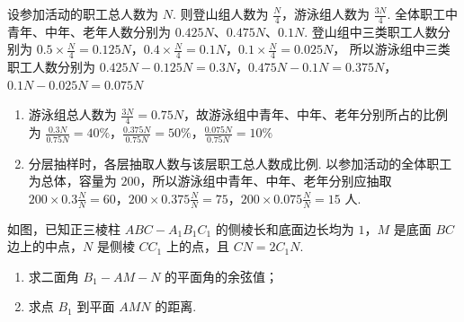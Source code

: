 \begin{solution}
设参加活动的职工总人数为 \(N\). 则登山组人数为 \(\frac N4\)，游泳组人数为 \(\frac{3N}{4}\). 全体职工中青年、中年、老年人数分别为 \(0.425N\)、\(0.475N\)、\(0.1N\). 登山组中三类职工人数分别为
\(0.5\times\frac N4=0.125N\)，\(0.4\times\frac N4=0.1N\)，\(0.1\times\frac N4=0.025N\)，
所以游泳组中三类职工人数分别为
\(0.425N-0.125N=0.3N\)，\(0.475N-0.1N=0.375N\)，\(0.1N-0.025N=0.075N\)

\begin{enumerate}
\item 游泳组总人数为 \(\frac{3N}{4}=0.75N\)，故游泳组中青年、中年、老年分别所占的比例为
\(\frac{0.3N}{0.75N}=40\%\)，\(\frac{0.375N}{0.75N}=50\%\)，\(\frac{0.075N}{0.75N}=10\%\)

\item 分层抽样时，各层抽取人数与该层职工总人数成比例. 以参加活动的全体职工为总体，容量为 \(200\)，所以游泳组中青年、中年、老年分别应抽取
\(200\times0.3\frac{N}{N}=60\)，\(200\times0.375\frac{N}{N}=75\)，\(200\times0.075\frac{N}{N}=15\)
人.
\end{enumerate}
\end{solution}

\begin{problem}
如图，已知正三棱柱 \(ABC - A_{1}B_{1}C_{1}\) 的侧棱长和底面边长均为 \(1\)，\(M\) 是底面 \(BC\) 边上的中点，\(N\) 是侧棱 \(CC_{1}\) 上的点，且 \(CN = 2C_{1}N\).

\begin{enumerate}
\item 求二面角 \(B_{1} - AM - N\) 的平面角的余弦值；
\item 求点 \(B_{1}\) 到平面 \(AMN\) 的距离.
\end{enumerate}

\end{problem}

